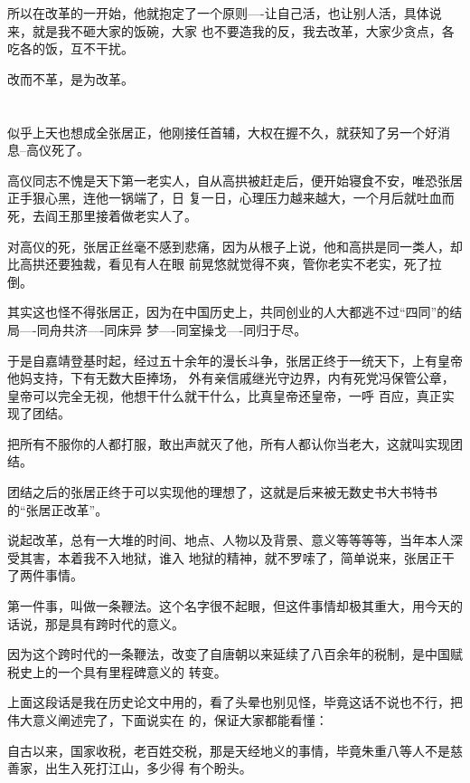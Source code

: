 \documentclass[11pt,a4paper,onecolumn]{article}
\begin{document}
所以在改革的一开始，他就抱定了一个原则----让自己活，也让别人活，具体说来，就是我不砸大家的饭碗，大家
也不要造我的反，我去改革，大家少贪点，各吃各的饭，互不干扰。

改而不革，是为改革。

\section[\thesection]{}

似乎上天也想成全张居正，他刚接任首辅，大权在握不久，就获知了另一个好消息--高仪死了。

高仪同志不愧是天下第一老实人，自从高拱被赶走后，便开始寝食不安，唯恐张居正手狠心黑，连他一锅端了，日
复一日，心理压力越来越大，一个月后就吐血而死，去阎王那里接着做老实人了。

对高仪的死，张居正丝毫不感到悲痛，因为从根子上说，他和高拱是同一类人，却比高拱还要独裁，看见有人在眼
前晃悠就觉得不爽，管你老实不老实，死了拉倒。

其实这也怪不得张居正，因为在中国历史上，共同创业的人大都逃不过``四同''的结局----同舟共济----同床异
梦----同室操戈----同归于尽。

于是自嘉靖登基时起，经过五十余年的漫长斗争，张居正终于一统天下，上有皇帝他妈支持，下有无数大臣捧场，
外有亲信戚继光守边界，内有死党冯保管公章，皇帝可以完全无视，他想干什么就干什么，比真皇帝还皇帝，一呼
百应，真正实现了团结。

把所有不服你的人都打服，敢出声就灭了他，所有人都认你当老大，这就叫实现团结。

团结之后的张居正终于可以实现他的理想了，这就是后来被无数史书大书特书的``张居正改革''。

说起改革，总有一大堆的时间、地点、人物以及背景、意义等等等等，当年本人深受其害，本着我不入地狱，谁入
地狱的精神，就不罗嗦了，简单说来，张居正干了两件事情。

第一件事，叫做一条鞭法。这个名字很不起眼，但这件事情却极其重大，用今天的话说，那是具有跨时代的意义。

因为这个跨时代的一条鞭法，改变了自唐朝以来延续了八百余年的税制，是中国赋税史上的一个具有里程碑意义的
转变。

上面这段话是我在历史论文中用的，看了头晕也别见怪，毕竟这话不说也不行，把伟大意义阐述完了，下面说实在
的，保证大家都能看懂：

自古以来，国家收税，老百姓交税，那是天经地义的事情，毕竟朱重八等人不是慈善家，出生入死打江山，多少得
有个盼头。

\section[\thesection]{}
\end{document}
